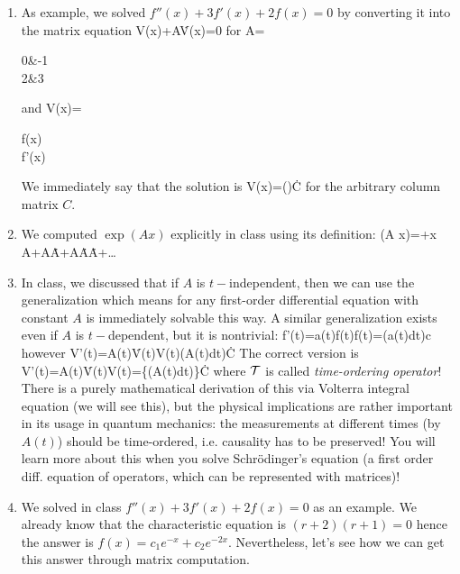 {\begin{enumerate}
		\item As example, we solved $f''(x)+3f'(x)+2f(x)=0$ by converting it into the matrix equation
		\be 
		V(x)+A\. V(x)=0
		\ee 
		for 
		\be 
		A=\begin{pmatrix}
		0&-1\\2&3
		\end{pmatrix}
		\ee
		and
		\be 
		V(x)=\begin{pmatrix}
			f(x)\\f'(x)
		\end{pmatrix}
		\ee 
		We immediately say that the solution is 
		\be 
		V(x)=()\. C
		\ee 
		for the arbitrary column matrix $C$.
		\item We computed $\exp(A x)$ explicitly in class using its definition:
		\be 
		\exp(A x)=+x A+A\.A+A\.A\.A+\dots
		\ee 
		\item In class, we discussed that if $A$ is $t-$independent, then we can use the generalization
		\be 
		\left[f'(t)=af(t)\rightarrow f(t)=\exp(at)c\right]\Rightarrow\left[V'(t)=A\.V(t)\rightarrow V(t)=\exp(At)\.C\right]
		\ee
		which means for any first-order differential equation with constant $A$ is immediately solvable this way. A similar generalization exists even if $A$ is $t-$dependent, but it is nontrivial: 
		\be 
		f'(t)=a(t)f(t)\rightarrow f(t)=\exp\left(\int a(t)dt\right)c
		\ee
		however
		\be 
		V'(t)=A(t)\.V(t)\rightarrow V(t)\ne \exp\left(\int A(t)dt\right)\.C
		\ee 
		The correct version is 
		\be 
		V'(t)=A(t)\.V(t)\rightarrow V(t)=\left\{\exp\left(\int A(t)dt\right)\right\}\.C
		\ee 
		where $\mathcal{T}$ is called \emph{time-ordering operator}! There is a purely mathematical derivation of this via Volterra integral equation (we will see this), but the physical implications are rather important in its usage in quantum mechanics: the measurements at different times (by $A(t)$) should be time-ordered, i.e. causality has to be preserved! You will learn more about this when you solve Schrödinger's equation (a first order diff. equation of operators, which can be represented with matrices)!
	\item We solved in class $f''(x)+3f'(x)+2f(x)=0$ as an example. We already know that the characteristic equation is $(r+2)(r+1)=0$ hence the answer is $f(x)=c_1 e^{-x}+c_2 e^{-2x}$. Nevertheless, let's see how we can get this answer through matrix computation.


\end{enumerate}}
